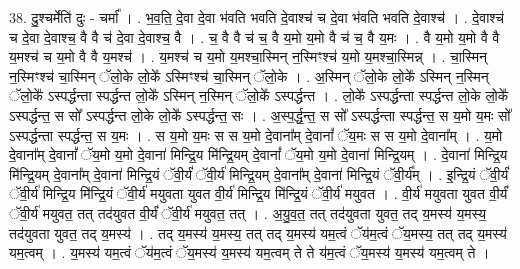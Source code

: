 \documentclass[17pt]{extarticle}
\begin{document}
38. दु॒श्चर्मेति॑ दुः - चर्मा᳚ । . भ॒व॒ति॒ दे॒वा दे॒वा भ॑वति भवति दे॒वाश्च॑ च दे॒वा भ॑वति भवति दे॒वाश्च॑ । . दे॒वाश्च॑ च दे॒वा दे॒वाश्च॒ वै वै च॑ दे॒वा दे॒वाश्च॒ वै । . च॒ वै वै च॑ च॒ वै य॒मो य॒मो वै च॑ च॒ वै य॒मः । . वै य॒मो य॒मो वै वै य॒मश्च॑ च य॒मो वै वै य॒मश्च॑ । . य॒मश्च॑ च य॒मो य॒मश्चा॒स्मिन् न॒स्मिꣳश्च॑ य॒मो य॒मश्चा॒स्मिन्न् । . चा॒स्मिन् न॒स्मिꣳश्च॑ चा॒स्मिन् ॅलो॒के लो॒के᳚ ऽस्मिꣳश्च॑ चा॒स्मिन् ॅलो॒के । . अ॒स्मिन् ॅलो॒के लो॒के᳚ ऽस्मिन् न॒स्मिन् ॅलो॒के᳚ ऽस्पर्द्धन्ता स्पर्द्धन्त लो॒के᳚ ऽस्मिन् न॒स्मिन् ॅलो॒के᳚ ऽस्पर्द्धन्त । . लो॒के᳚ ऽस्पर्द्धन्ता स्पर्द्धन्त लो॒के लो॒के᳚ ऽस्पर्द्धन्त॒ स सो᳚ ऽस्पर्द्धन्त लो॒के लो॒के᳚ ऽस्पर्द्धन्त॒ सः । . अ॒स्प॒र्द्ध॒न्त॒ स सो᳚ ऽस्पर्द्धन्ता स्पर्द्धन्त॒ स य॒मो य॒मः सो᳚ ऽस्पर्द्धन्ता स्पर्द्धन्त॒ स य॒मः । . स य॒मो य॒मः स स य॒मो दे॒वाना᳚म् दे॒वानां᳚ ॅय॒मः स स य॒मो दे॒वाना᳚म् । . य॒मो दे॒वाना᳚म् दे॒वानां᳚ ॅय॒मो य॒मो दे॒वाना॑ मिन्द्रि॒य मि॑न्द्रि॒यम् दे॒वानां᳚ ॅय॒मो य॒मो दे॒वाना॑ मिन्द्रि॒यम् । . दे॒वाना॑ मिन्द्रि॒य मि॑न्द्रि॒यम् दे॒वाना᳚म् दे॒वाना॑ मिन्द्रि॒यं ॅवी॒र्यं॑ ॅवी॒र्य॑ मिन्द्रि॒यम् दे॒वाना᳚म् दे॒वाना॑ मिन्द्रि॒यं ॅवी॒र्य᳚म् । . इ॒न्द्रि॒यं ॅवी॒र्यं॑ ॅवी॒र्य॑ मिन्द्रि॒य मि॑न्द्रि॒यं ॅवी॒र्य॑ मयुवता युवत वी॒र्य॑ मिन्द्रि॒य मि॑न्द्रि॒यं ॅवी॒र्य॑ मयुवत । . वी॒र्य॑ मयुवता युवत वी॒र्यं॑ ॅवी॒र्य॑ मयुवत॒ तत् तद॑युवत वी॒र्यं॑ ॅवी॒र्य॑ मयुवत॒ तत् । . अ॒यु॒व॒त॒ तत् तद॑युवता युवत॒ तद् य॒मस्य॑ य॒मस्य॒ तद॑युवता युवत॒ तद् य॒मस्य॑ । . तद् य॒मस्य॑ य॒मस्य॒ तत् तद् य॒मस्य॑ यम॒त्वं ॅय॑म॒त्वं ॅय॒मस्य॒ तत् तद् य॒मस्य॑ यम॒त्वम् । . य॒मस्य॑ यम॒त्वं ॅय॑म॒त्वं ॅय॒मस्य॑ य॒मस्य॑ यम॒त्वम् ते ते य॑म॒त्वं ॅय॒मस्य॑ य॒मस्य॑ यम॒त्वम् ते । \newline
\pagebreak
{}
\end{document}
